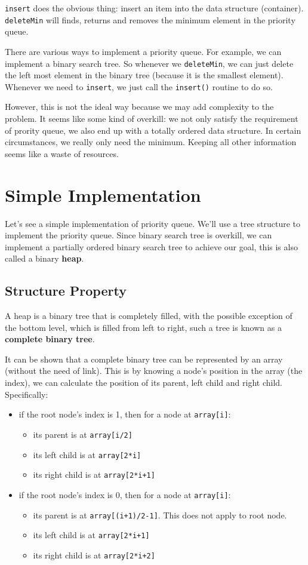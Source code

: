 \documentclass[12pt]{book}
\begin{document}
\texttt{insert} does the obvious thing: insert an item into the data structure (container).
\texttt{deleteMin} will finds, returns and removes the minimum element in the priority queue.

There are various ways to implement a priority queue. For example, we can implement a binary search tree. So whenever we \texttt{deleteMin}, we can just delete the left most element in the binary tree (because it is the smallest element). Whenever we need to \texttt{insert}, we just call the \texttt{insert()} routine to do so.

However, this is not the ideal way because we may add complexity to the problem. It seems like some kind of overkill: we not only satisfy the requirement of prority queue, we also end up with a totally ordered data structure. In certain circumstances, we really only need the minimum. Keeping all other information seems like a waste of resources.
\section{Simple Implementation}
\label{sec:org18ad1f2}
Let's see a simple implementation of priority queue. We'll use a tree structure to implement the priority queue. Since binary search tree is overkill, we can implement a partially ordered binary search tree to achieve our goal, this is also called a binary \textbf{heap}.
\subsection{Structure Property}
\label{sec:org79b3450}

A heap is a binary tree that is completely filled, with the possible exception of the bottom level, which is filled from left to right, such a tree is known as a \textbf{complete binary tree}.

It can be shown that a complete binary tree can be represented by an array (without the need of link). This is by knowing a node's position in the array (the index), we can calculate the position of its parent, left child and right child. Specifically:
\begin{itemize}
\item if the root node's index is 1, then for a node at \texttt{array[i]}:
\begin{itemize}
\item its parent is at \texttt{array[i/2]}
\item its left child is at \texttt{array[2*i]}
\item its right child is at \texttt{array[2*i+1]}
\end{itemize}
\item if the root node's index is 0, then for a node at \texttt{array[i]}:
\begin{itemize}
\item its parent is at \texttt{array[(i+1)/2-1]}. This does not apply to root node.
\item its left child is at \texttt{array[2*i+1]}
\item its right child is at \texttt{array[2*i+2]}
\end{itemize}
\end{itemize}
\end{document}
